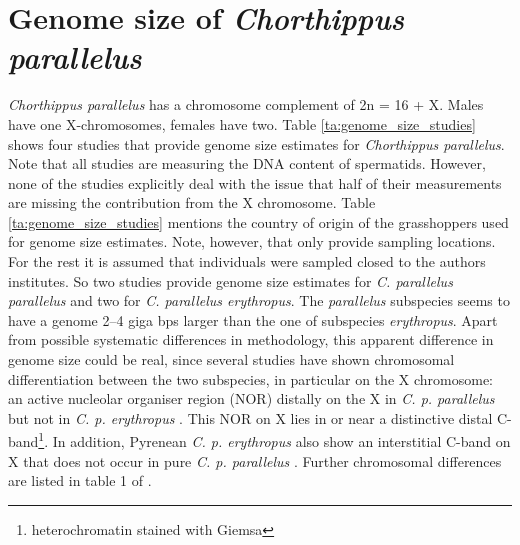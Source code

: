 \documentclass[a4paper,12pt,times,print,index, custombib]{PhDThesisPSnPDF}\usepackage[]{graphicx}\usepackage[]{color}
\begin{document}
\FloatBarrier
\section{Genome size of \textit{Chorthippus parallelus}}\label{ch:Genome_size}

\textit{Chorthippus parallelus} has a chromosome complement of 2n = 16 + X. Males have one X-chromosomes, females have two. Table \ref{ta:genome_size_studies} shows four studies that provide genome size estimates for \textit{Chorthippus parallelus}. Note that all studies are measuring the DNA content of spermatids. However, none of the studies explicitly deal with the issue that half of their measurements are missing the contribution from the X chromosome. Table \ref{ta:genome_size_studies} mentions the country of origin of the grasshoppers used for genome size estimates. Note, however, that only \cite{Belda1991} provide sampling locations. For the rest it is assumed that individuals were sampled closed to the authors institutes. So two studies provide genome size estimates for \textit{C. parallelus parallelus} and two for \textit{C. parallelus erythropus}. The \textit{parallelus} subspecies seems to have a genome 2--4 giga \glspl{bp} larger than the one of subspecies \textit{erythropus}. Apart from possible systematic differences in methodology, this apparent difference in genome size could be real, since several studies have shown chromosomal differentiation between the two subspecies, in particular on the X chromosome: an active nucleolar organiser region (NOR) distally on the X in \textit{C. p. parallelus} but not in \textit{C. p. erythropus} \citep{Gosalvez1988}. This NOR on X lies in or near a distinctive distal C-band\footnote{\gls{heterochromatin} stained with Giemsa}. In addition, Pyrenean \textit{C. p. erythropus} also show an interstitial C-band on X that does not occur in pure \textit{C. p. parallelus} \citep{Bella2007}. Further chromosomal differences are listed in table 1 of \cite{Ferris1993}.
\end{document}
